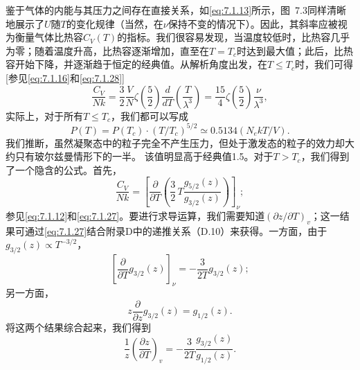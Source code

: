 鉴于气体的内能与其压力之间存在直接关系，如\autoref{eq:7.1.13}所示，图~7.3同样清晰地展示了\(U\)随\(T\)的变化规律（当然，在\(\nu\)保持不变的情况下）。因此，其斜率应被视为衡量气体比热容\(C_V(T)\)的指标。我们很容易发现，当温度较低时，比热容几乎为零；随着温度升高，比热容逐渐增加，直至在\(T = T_c\)时达到最大值；此后，比热容开始下降，并逐渐趋于恒定的经典值。从解析角度出发，在\(T \leq T_c\)时，我们可得{[}参见\autoref{eq:7.1.16}和\autoref{eq:7.1.28}{]}
\begin{equation}\tag{7.1.32}\label{eq:7.1.32}
\frac { C _ { V } } { N k } = \frac { 3 } { 2 } \frac { V } { N } \zeta \left( \frac { 5 } { 2 } \right) \frac { d } { d T } \left( \frac { T } { \lambda ^{3} } \right) = \frac { 15 } { 4 } \zeta \left( \frac { 5 } { 2 } \right) \frac { \nu } { \lambda ^{3} } ,
\end{equation}
实际上，对于所有\(T \leq T_{c}\)，我们都可以写成
\begin{equation}\tag{7.1.33}\label{eq:7.1.33}
P ( T ) = P ( T _ { c } ) \cdot ( T / T _ { c } ) ^{5 / 2} \simeq 0 . 51 34 ( N _ { e } k T / V ) .
\end{equation}
我们推断，虽然凝聚态中的粒子完全不产生压力，但处于激发态的粒子的效力却大约只有玻尔兹曼情形下的一半。
该值明显高于经典值1.5。对于\(T > T_{c}\)，我们得到了一个隐含的公式。首先，
\begin{equation}\tag{7.1.34}\label{eq:7.1.34}
\frac { C _ { V } } { N k } = \left[ \frac { \partial } { \partial T } \left( \frac { 3 } { 2 } \, T \frac { g _ { 5 / 2 } ( z ) } { g _ { 3 / 2 } ( z ) } \right) \right] _ { \nu } ;
\end{equation}
参见\autoref{eq:7.1.12}和\autoref{eq:7.1.27}。要进行求导运算，我们需要知道\((\partial z/\partial T)_v\)；这一结果可通过\autoref{eq:7.1.27}结合附录D中的递推关系（D.10）来获得。一方面，由于\(g_{3/2}(z) \propto T^{-3/2}\)，
\begin{equation}\tag{7.1.35}\label{eq:7.1.35}
\left[ \frac { \partial } { \partial T } g _ { 3 / 2 } ( z ) \right] _ { \nu } = - \frac { 3 } { 2 T } g _ { 3 / 2 } ( z ) ;
\end{equation}
另一方面，
\begin{equation}\tag{7.1.36}\label{eq:7.1.36}
z \frac { \partial } { \partial z } g _ { 3 / 2 } ( z ) = g _ { 1 / 2 } ( z ) .
\end{equation}
将这两个结果综合起来，我们得到
\begin{equation}\tag{7.1.37}\label{eq:7.1.37}
\frac { 1 } { z } \left( \frac { \partial z } { \partial T } \right) _ { v } = - \frac { 3 } { 2 T } \frac { g _ { 3 / 2 } ( z ) } { g _ { 1 / 2 } ( z ) } .
\end{equation}
